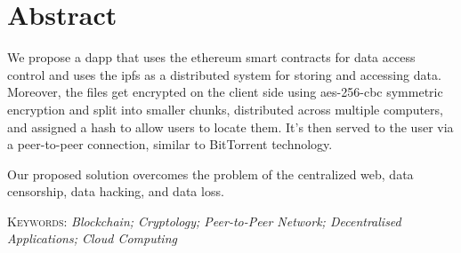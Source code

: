 \chapter*{Abstract}

We propose a \acrfull{dapp} that uses the \Gls{ethereum} \gls{smart contract}s for data access control and uses the \acrfull{ipfs} as a distributed system for storing and accessing data. Moreover, the files get encrypted on the client side using \acrshort{aes}-256-\acrshort{cbc} symmetric encryption and split into smaller chunks, distributed across multiple computers, and assigned a hash to allow users to locate them. It’s then served to the user via a peer-to-peer connection, similar to BitTorrent technology.

Our proposed solution overcomes the problem of the \gls{centralized} web, data censorship, data hacking, and data loss.

\vspace{1cm}
\noindent
\textsc{Keywords}: \textsl{ Blockchain; Cryptology; Peer-to-Peer Network; Decentralised Applications; Cloud Computing}
